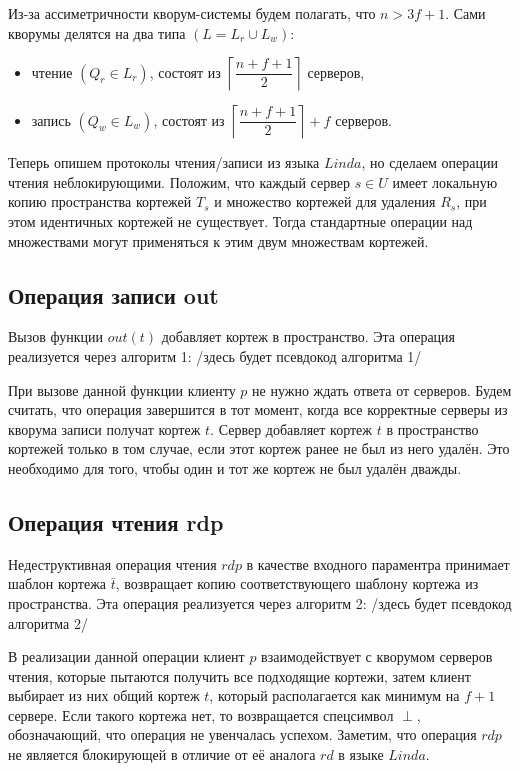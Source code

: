 Из-за ассиметричности кворум-системы будем полагать, что  $n > 3f + 1$. Сами кворумы делятся на два типа $(L = L_r \cup L_w)$:
\begin{itemize}
	\item чтение $(Q_r \in L_r)$, состоят из $\left\lceil \dfrac{n+f+1}{2} \right\rceil$ серверов,
	\item запись $(Q_w \in L_w)$, состоят из $\left\lceil \dfrac{n+f+1}{2} \right\rceil + f$ серверов.
\end{itemize}

Теперь опишем протоколы чтения/записи из языка $Linda$, но сделаем операции чтения неблокирующими. Положим, что каждый сервер $s \in U$ имеет локальную копию пространства кортежей $T_s$ и множество кортежей для удаления $R_s$, при этом идентичных кортежей не существует. Тогда стандартные операции над множествами могут применяться к этим двум множествам кортежей.

\subsection{Операция записи out}\label{subsec5:1}
Вызов функции $out(t)$ добавляет кортеж в пространство. Эта операция реализуется через алгоритм 1: /здесь будет псевдокод алгоритма 1/

При вызове данной функции клиенту $p$ не нужно ждать ответа от серверов. Будем считать, что операция завершится в тот момент, когда все корректные серверы из кворума записи получат кортеж $t$. Сервер добавляет кортеж $t$ в пространство кортежей только в том случае, если этот кортеж ранее не был из него удалён. Это необходимо для того, чтобы один и тот же кортеж не был удалён дважды.

\subsection{Операция чтения rdp}\label{subsec5:2}
Недеструктивная операция чтения $rdp$ в качестве входного параментра принимает шаблон кортежа $\bar{t}$, возвращает копию соответствующего шаблону кортежа из пространства. Эта операция реализуется через алгоритм 2: /здесь будет псевдокод алгоритма 2/

В реализации данной операции клиент $p$ взаимодействует с кворумом серверов чтения, которые пытаются получить все подходящие кортежи, затем клиент выбирает из них общий кортеж $t$, который располагается как минимум на $f + 1$ сервере. Если такого кортежа нет, то возвращается спецсимвол $\perp$, обозначающий, что операция не увенчалась успехом. Заметим, что операция $rdp$ не является блокирующей в отличие от её аналога $rd$ в языке $Linda$.

